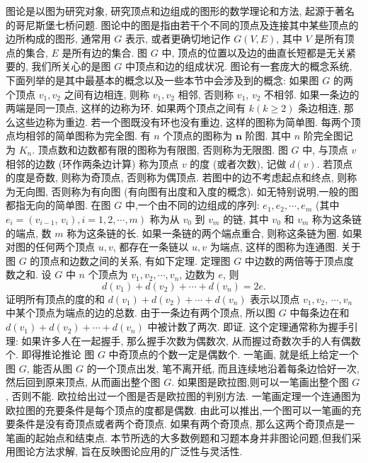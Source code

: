 
图论是以图为研究对象, 研究顶点和边组成的图形的数学理论和方法, 起源于著名的哥尼斯堡七桥问题.
图论中的图是指由若干个不同的顶点及连接其中某些顶点的边所构成的图形, 通常用 $G$ 表示, 或者更确切地记作 $G(V, E)$, 其中 $V$ 是所有顶点的集合, $E$ 是所有边的集合.
图 $G$ 中, 顶点的位置以及边的曲直长短都是无关紧要的, 我们所关心的是图 $G$ 中顶点和边的组成状况.
图论有一套庞大的概念系统, 下面列举的是其中最基本的概念以及一些本节中会涉及到的概念:
如果图 $G$ 的两个顶点 $v_1, v_2$ 之间有边相连, 则称 $v_1, v_2$ 相邻, 否则称 $v_1$, $v_2$ 不相邻.
如果一条边的两端是同一顶点, 这样的边称为环.
如果两个顶点之间有 $k(k \geqslant 2)$ 条边相连, 那么这些边称为重边.
若一个图既没有环也没有重边, 这样的图称为简单图.
每两个顶点均相邻的简单图称为完全图.
有 $n$ 个顶点的图称为 $\boldsymbol{n}$ 阶图.
其中 $n$ 阶完全图记为 $K_n$.
顶点数和边数都有限的图称为有限图, 否则称为无限图.
图 $G$ 中, 与顶点 $v$ 相邻的边数 (环作两条边计算) 称为顶点 $v$ 的度 (或者次数), 记做 $d(v)$. 若顶点的度是奇数, 则称为奇顶点, 否则称为偶顶点.
若图中的边不考虑起点和终点, 则称为无向图, 否则称为有向图 (有向图有出度和入度的概念). 如无特别说明,一般的图都指无向的简单图.
在图 $G$ 中,一个由不同的边组成的序列: $e_1, e_2, \cdots, e_m$ (其中 $e_i=\left(v_{i-1}\right.$, $\left.\left.v_i\right), i=1,2, \cdots, m\right)$ 称为从 $v_0$ 到 $v_m$ 的链, 其中 $v_0$ 和 $v_m$ 称为这条链的端点, 数 $m$ 称为这条链的长.
如果一条链的两个端点重合, 则称这条链为圈.
如果对图的任何两个顶点 $u, v$, 都存在一条链以 $u, v$ 为端点, 这样的图称为连通图.
关于图 $G$ 的顶点和边数之间的关系, 有如下定理.
定理图 $G$ 中边数的两倍等于顶点度数之和.
设 $G$ 中 $n$ 个顶点为 $v_1, v_2, \cdots, v_n$, 边数为 $e$, 则
$$
d\left(v_1\right)+d\left(v_2\right)+\cdots+d\left(v_n\right)=2 e .
$$
证明所有顶点的度的和 $d\left(v_1\right)+d\left(v_2\right)+\cdots+d\left(v_n\right)$ 表示以顶点 $v_1, v_2$, $\cdots, v_n$ 中某个顶点为端点的边的总数.
由于一条边有两个顶点, 所以图 $G$ 中每条边在和 $d\left(v_1\right)+d\left(v_2\right)+\cdots+d\left(v_n\right)$ 中被计数了两次.
即证.
这个定理通常称为握手引理: 如果许多人在一起握手, 那么握手次数为偶数次, 从而握过奇数次手的人有偶数个.
即得推论推论 图 $G$ 中奇顶点的个数一定是偶数个.
一笔画, 就是纸上给定一个图 $G$, 能否从图 $G$ 的一个顶点出发, 笔不离开纸, 而且连续地沿着每条边恰好一次, 然后回到原来顶点, 从而画出整个图 $G$. 如果图是欧拉图,则可以一笔画出整个图 $G$, 否则不能.
欧拉给出过一个图是否是欧拉图的判别方法.
一笔画定理一个连通图为欧拉图的充要条件是每个顶点的度都是偶数.
由此可以推出,一个图可以一笔画的充要条件是没有奇顶点或者两个奇顶点.
如果有两个奇顶点, 那么这两个奇顶点是一笔画的起始点和结束点.
本节所选的大多数例题和习题本身并非图论问题,但我们采用图论方法求解, 旨在反映图论应用的广泛性与灵活性.



